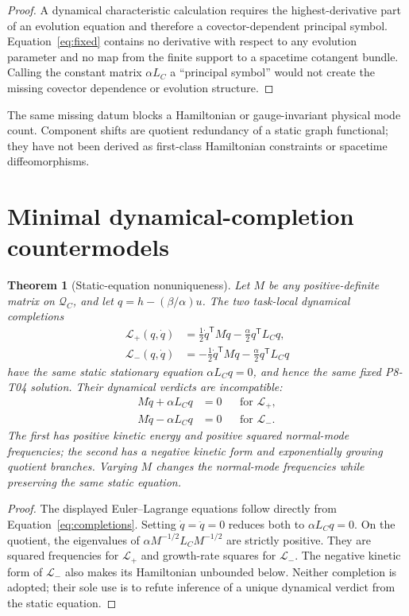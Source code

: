 \documentclass[11pt]{article}
\newtheorem{theorem}{Theorem}
\newcommand{\Qspace}{\mathcal Q_C}
\begin{document}
\begin{proof}
A dynamical characteristic calculation requires the highest-derivative
part of an evolution equation and therefore a covector-dependent principal
symbol.  Equation~\eqref{eq:fixed} contains no derivative with respect to
any evolution parameter and no map from the finite support to a spacetime
cotangent bundle.  Calling the constant matrix \(\alpha L_C\) a
``principal symbol'' would not create the missing covector dependence or
evolution structure.
\end{proof}

The same missing datum blocks a Hamiltonian or gauge-invariant physical
mode count.  Component shifts are quotient redundancy of a static graph
functional; they have not been derived as first-class Hamiltonian
constraints or spacetime diffeomorphisms.

\section{Minimal dynamical-completion countermodels}

\begin{theorem}[Static-equation nonuniqueness]
\label{thm:countermodel}
Let \(M\) be any positive-definite matrix on \(\Qspace\), and let
\(q=h-(\beta/\alpha)u\).  The two task-local dynamical completions
\begin{align}
 \mathcal L_{+}(q,\dot q)
 &=\frac12\dot q^{\mathsf T}M\dot q
   -\frac{\alpha}{2}q^{\mathsf T}L_Cq,\\
 \mathcal L_{-}(q,\dot q)
 &=-\frac12\dot q^{\mathsf T}M\dot q
   -\frac{\alpha}{2}q^{\mathsf T}L_Cq
 \label{eq:completions}
\end{align}
have the same static stationary equation
\(\alpha L_Cq=0\), and hence the same fixed P8-T04 solution.  Their
dynamical verdicts are incompatible:
\begin{align}
 M\ddot q+\alpha L_Cq&=0
 &&\text{for }\mathcal L_{+},\\
 M\ddot q-\alpha L_Cq&=0
 &&\text{for }\mathcal L_{-}.
\end{align}
The first has positive kinetic energy and positive squared normal-mode
frequencies; the second has a negative kinetic form and exponentially
growing quotient branches.  Varying \(M\) changes the normal-mode
frequencies while preserving the same static equation.
\end{theorem}

\begin{proof}
The displayed Euler--Lagrange equations follow directly from
Equation~\eqref{eq:completions}.  Setting \(\dot q=\ddot q=0\) reduces both
to \(\alpha L_Cq=0\).  On the quotient, the eigenvalues of
\(\alpha M^{-1/2}L_CM^{-1/2}\) are strictly positive.  They are squared
frequencies for \(\mathcal L_{+}\) and growth-rate squares for
\(\mathcal L_{-}\).  The negative kinetic form of \(\mathcal L_{-}\)
also makes its Hamiltonian unbounded below.  Neither completion is adopted;
their sole use is to refute inference of a unique dynamical verdict from
the static equation.
\end{proof}
\end{document}
